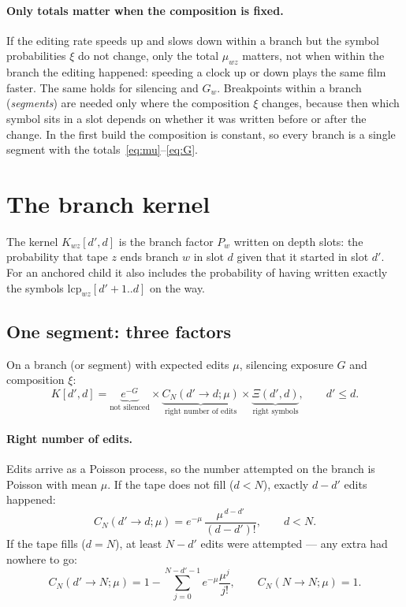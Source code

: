 \documentclass[11pt]{article}
\newcommand{\lcp}{\mathrm{lcp}}
\begin{document}
\paragraph{Only totals matter when the composition is fixed.} If the editing rate speeds up and slows
down within a branch but the symbol probabilities $\xi$ do not change, only the total $\mu_{wz}$
matters, not when within the branch the editing happened: speeding a clock up or down plays the same
film faster. The same holds for silencing and $G_w$. Breakpoints within a branch (\emph{segments})
are needed only where the composition $\xi$ changes, because then which symbol sits in a slot depends
on whether it was written before or after the change. In the first build the composition is
constant, so every branch is a single segment with the totals~\eqref{eq:mu}--\eqref{eq:G}.

\section{The branch kernel}\label{sec:kernel}

The kernel $K_{wz}[d',d]$ is the branch factor $P_w$ written on depth slots: the probability that tape
$z$ ends branch $w$ in slot $d$ given that it started in slot $d'$. For an anchored child it also
includes the probability of having written exactly the symbols $\lcp_{wz}[d'+1..d]$ on the way.

\subsection{One segment: three factors}

On a branch (or segment) with expected edits $\mu$, silencing exposure $G$ and composition $\xi$:
\begin{equation}
\boxed{\;K[d',d]=\underbrace{e^{-G}}_{\text{not silenced}}\times
\underbrace{C_N(d'\to d;\mu)}_{\text{right number of edits}}\times
\underbrace{\Xi(d',d)}_{\text{right symbols}},\qquad d'\le d.\;}
\label{eq:kernel}
\end{equation}

\paragraph{Right number of edits.} Edits arrive as a Poisson process, so the number attempted on
the branch is Poisson with mean $\mu$. If the tape does not fill ($d<N$), exactly $d-d'$ edits
happened:
\begin{equation}
C_N(d'\to d;\mu)=e^{-\mu}\,\frac{\mu^{\,d-d'}}{(d-d')!},\qquad d<N.
\end{equation}
If the tape fills ($d=N$), at least $N-d'$ edits were attempted --- any extra had nowhere to go:
\begin{equation}
C_N(d'\to N;\mu)=1-\sum_{j=0}^{N-d'-1}e^{-\mu}\frac{\mu^j}{j!},\qquad C_N(N\to N;\mu)=1 .
\end{equation}
\end{document}
